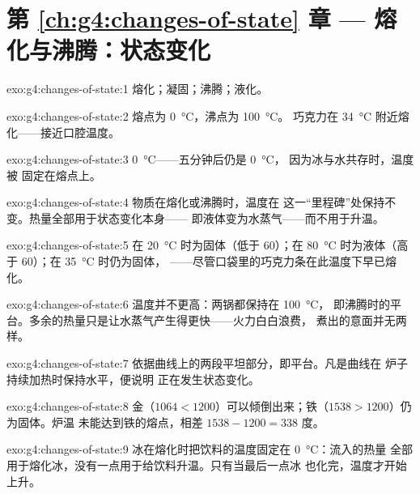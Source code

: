 \section*{第 \ref{ch:g4:changes-of-state} 章 --- 熔化与沸腾：状态变化}

\begin{solution}{exo:g4:changes-of-state:1}
熔化；凝固；沸腾；液化。
\end{solution}

\begin{solution}{exo:g4:changes-of-state:2}
熔点为 \qty{0}{\celsius}，沸点为 \qty{100}{\celsius}。
巧克力在 \qty{34}{\celsius} 附近熔化——接近口腔温度。
\end{solution}

\begin{solution}{exo:g4:changes-of-state:3}
\qty{0}{\celsius}——五分钟后仍是 \qty{0}{\celsius}，
因为冰与水共存时，温度被
固定在熔点上。
\end{solution}

\begin{solution}{exo:g4:changes-of-state:4}
物质在熔化或沸腾时，温度在
这一“里程碑”处保持不变。热量全部用于状态变化本身——
即液体变为水蒸气——而不用于升温。
\end{solution}

\begin{solution}{exo:g4:changes-of-state:5}
在 \qty{20}{\celsius} 时为固体（低于 $60$）；在
\qty{80}{\celsius} 时为液体（高于 $60$）；在 \qty{35}{\celsius} 时仍为固体，
——尽管口袋里的巧克力条在此温度下早已熔化。
\end{solution}

\begin{solution}{exo:g4:changes-of-state:6}
温度并不更高：两锅都保持在 \qty{100}{\celsius}，
即沸腾时的平台。多余的热量只是让水蒸气产生得更快——火力白白浪费，
煮出的意面并无两样。
\end{solution}

\begin{solution}{exo:g4:changes-of-state:7}
依据曲线上的两段平坦部分，即平台。凡是曲线在
炉子持续加热时保持水平，便说明
正在发生状态变化。
\end{solution}

\begin{solution}{exo:g4:changes-of-state:8}
金（$1064 < 1200$）可以倾倒出来；铁（$1538 > 1200$）仍为固体。炉温
未能达到铁的熔点，相差 $1538 - 1200 = 338$ 度。
\end{solution}

\begin{solution}{exo:g4:changes-of-state:9}
冰在熔化时把饮料的温度固定在 \qty{0}{\celsius}：流入的热量
全部用于熔化冰，没有一点用于给饮料升温。只有当最后一点冰
也化完，温度才开始上升。
\end{solution}

